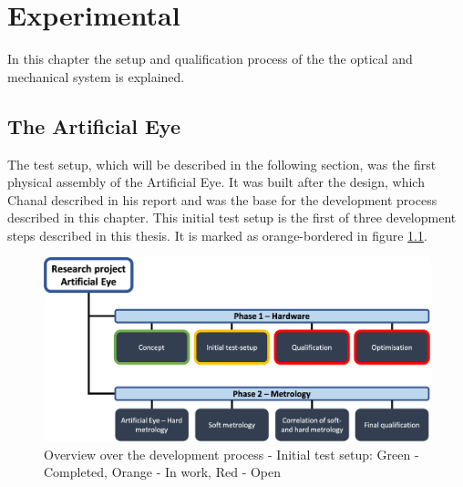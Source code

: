 \chapter{Experimental}
\label{experimental}

In this chapter the setup and qualification process of the the optical and mechanical system is explained.  







\section{The Artificial Eye}
The test setup, which will be described in the following section, was the first physical assembly of the Artificial Eye. It was built after the design, which Chanal described in his report and was the base for the development process described in this chapter. This initial test setup is the first of three development steps described in this thesis. It is marked as orange-bordered in figure \ref{ChainTestSetup}.

\begin{figure}[h]
\begin{center}
\includegraphics[width=12cm]{Pictures/ChainTestSetup}
\caption[Overview over the development process - Initial test setup]{Overview over the development process - Initial test setup: Green - Completed, Orange - In work, Red - Open}
\label{ChainTestSetup}
\end{center}
\end{figure}


